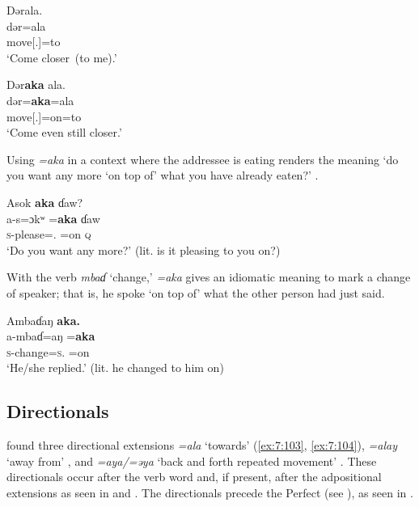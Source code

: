 \ea\label{ex:7:99}
Dərala.\\
\gll  dər=ala\\
      move[{\twoS}.{\IMP}]=to\\
\glt  ‘Come closer~(to me).’\\
\z 

\ea\label{ex:7:100}
Dər\textbf{aka}  ala.\\
\gll  dər=\textbf{aka}=ala\\
      move[{\twoS}.{\IMP}]=on=to\\
\glt  ‘Come even still closer.’\\
\z 

Using \textit{=aka} in a context where the addressee is eating renders the meaning ‘do you want any more ‘on top of’ what you have already eaten?’ .

\ea\label{ex:7:101}
Asok  \textbf{aka}  ɗaw?~\\
\gll  a-s=ɔkʷ   =\textbf{aka}  ɗaw\\
      \textsc{s}-please={\twoS}.{\IO}  =on   {\textsc{q}}\\
\glt  ‘Do you want any more?’ (lit. is it pleasing to you on?)\\
\z 

With the verb \textit{mbaɗ}  ‘change,’ \textit{=aka} gives an idiomatic meaning to mark a change of speaker; that is, he spoke ‘on top of’ what the other person had just said.

\ea\label{ex:7:102}
Ambaɗaŋ  \textbf{aka.}\\
\gll  a-mbaɗ=aŋ   =\textbf{aka}\\
      \textsc{s}-change=\textsc{s}.{\IO}   =on\\
\glt  ‘He/she replied.’ (lit. he changed to him on)\\
\z {}
\subsection{Directionals}\label{sec:7.5.2}
\hypertarget{RefHeading1212361525720847}{}
\citet{FriesenMamalis2008} found three directional extensions \textit{=ala} ‘towards’ (\ref{ex:7:103}, \ref{ex:7:104}), \textit{=alay} ‘away from’ , and \textit{=aya/=əya} ‘back and forth repeated movement’ . These directionals occur after the verb word and, if present, after the adpositional extensions as seen in  and .  The directionals precede the Perfect (see ), as seen in .


